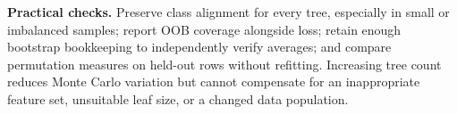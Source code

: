 \textbf{Practical checks.} Preserve class alignment for every tree, especially in small or imbalanced samples;
report OOB coverage alongside loss; retain enough bootstrap bookkeeping to independently verify averages;
and compare permutation measures on held-out rows without refitting. Increasing tree count reduces Monte Carlo
variation but cannot compensate for an inappropriate feature set, unsuitable leaf size, or a changed data population.


